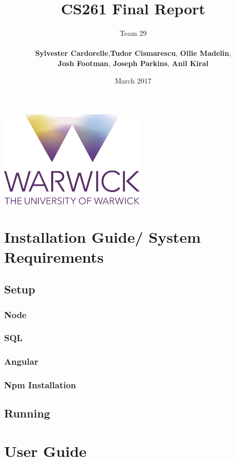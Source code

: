 \documentclass[12pt]{article}
\title{CS261 Final Report}
\author{Team 29 \\\\ \textbf{Sylvester Cardorelle},\textbf{Tudor Cismarescu}, \textbf{Ollie Madelin},\\
\textbf{Josh Footman}, \textbf{Joseph Parkins}, \textbf{Anil Kiral}}
\date{March 2017}
\begin{document}
\begin{titlepage}
\maketitle
\centering
\vfill
\vfill
\includegraphics[width=7cm]{logo.png}
\vfill
\vfill
\thispagestyle{empty}
\end{titlepage}
\tableofcontents
\newpage
\section{Installation Guide/ System Requirements}
	\subsection{Setup}
		\subsubsection{Node}
    \subsubsection{SQL}
    \subsubsection{Angular}
    \subsubsection{Npm Installation}
  \subsection{Running}
\section{User Guide}
\end{document}
